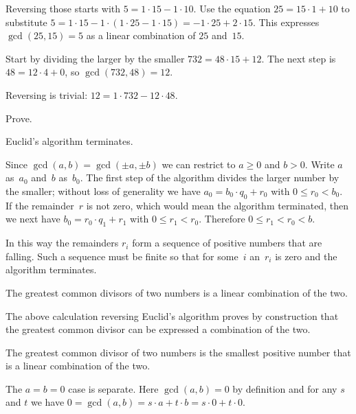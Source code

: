 \documentclass{test}  %
\begin{document}
\begin{bezoutproof}
\begin{problem}
\begin{answer}
\begin{items}
  Reversing those starts with $5=1\cdot 15-1\cdot 10$.
  Use the equation $25=15\cdot 1+10$ to substitute 
  $5=1\cdot 15-1\cdot(1\cdot 25-1\cdot 15)=-1\cdot 25+2\cdot 15$.
  This expresses $\gcd(25,15)=5$ as a linear combination of
  $25$ and~$15$.
\item Start by dividing the larger by the smaller
  $732=48\cdot 15+12$.
  The next step is $48=12\cdot 4+0$, so $\gcd(732,48)=12$.

  Reversing is trivial:
  $12=1\cdot 732-12\cdot 48$.
\end{items}
\end{answer}
\end{problem}

\begin{problem} Prove.  \label{ex:Bezout}
\begin{exes}
\begin{exercise} 
  Euclid's algorithm terminates.
\end{exercise}
\begin{answer}
  Since $\gcd(a,b)=\gcd(\pm a, \pm b)$ we can restrict to $a\geq 0$
  and $b>0$.
  Write $a$ as~$a_0$ and~$b$ as~$b_0$.
  The first step of the algorithm divides the larger number by the smaller; 
  without loss of generality we have $a_0=b_0\cdot q_0+r_0$ with 
  $0\leq r_0< b_0$.
  If the remainder~$r$ is not zero, which would mean the algorithm 
  terminated,
  then we next have $b_0=r_0\cdot q_1+r_1$ with $0\leq r_1< r_0$.
  Therefore $0\leq r_1<r_0<b$.

  In this way the remainders $r_i$ form a sequence of positive numbers that
  are falling.
  Such a sequence must be finite so that for some~$i$ 
  an~$r_i$ is zero and the algorithm terminates.  
\end{answer}
\begin{exercise} 
  The greatest common divisors of two numbers is a linear combination of 
  the two.
\end{exercise}
\begin{answer}
  The above calculation reversing Euclid's algorithm proves by
  construction that the greatest common divisor can be expressed 
  a combination of the two. 
\end{answer}
\begin{exercise}  
  The greatest common divisor of two numbers is the smallest positive
  number that is a linear combination of the two.
\end{exercise}
\begin{answer}
  The $a=b=0$ case is separate.
  Here $\gcd(a,b)=0$ by definition and for any $s$ and $t$ we
  have $0=\gcd(a,b)=s\cdot a+t\cdot b=s\cdot 0+t\cdot 0$.


\end{answer}
\end{exes}
\end{problem}
\end{bezoutproof}
\end{document}
